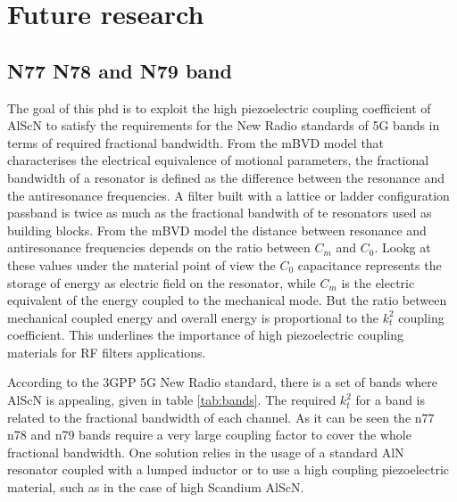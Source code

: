 \chapter{Future research}



\section{N77 N78 and N79 band}
The goal of this phd is to exploit the high piezoelectric coupling coefficient of AlScN to satisfy the requirements for the New Radio standards of 5G bands in terms of required fractional bandwidth. From the mBVD model that characterises the electrical equivalence of motional parameters, the fractional bandwidth of a resonator is defined as the difference between the resonance and the antiresonance frequencies. A filter built with a lattice or ladder configuration passband is twice as much as the fractional bandwith of te resonators used as building blocks. From the mBVD model the distance between resonance and antiresonance frequencies depends on the ratio between $C_m$ and $ C_0 $. Lookg at these values under the material point of view the $ C_0 $ capacitance represents the storage of energy as electric field on the resonator, while $ C_m $ is the electric equivalent of the energy coupled to the mechanical mode. But the ratio between mechanical coupled energy and overall energy is proportional to the $ k_t^2 $ coupling coefficient. This underlines the importance of high piezoelectric coupling materials for RF filters applications. 

According to the 3GPP 5G New Radio standard, there is a set of bands where AlScN is appealing, given in table \ref{tab:bands}. The required $ k_t^2 $ for a band is related to the fractional bandwidth of each channel. As it can be seen the n77 n78 and n79 bands require a very large coupling factor to cover the whole fractional bandwidth. One solution relies in the usage of a standard AlN resonator coupled with a lumped inductor \cite{gao_aln_2020} or to use a high coupling piezoelectric material, such as in the case of high Scandium AlScN. 


